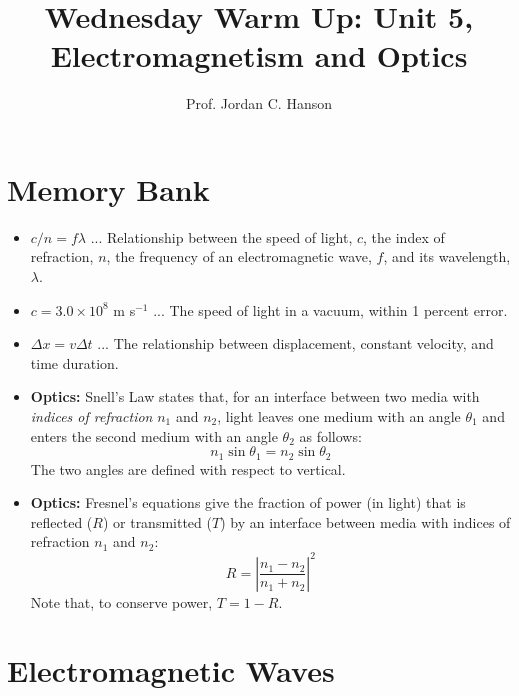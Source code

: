 \documentclass{article}
\begin{document}
\twocolumn

\title{Wednesday Warm Up: Unit 5, Electromagnetism and Optics}
\author{Prof. Jordan C. Hanson}

\maketitle

\section{Memory Bank}

\begin{itemize}
\item $c/n = f \lambda$ ... Relationship between the speed of light, $c$, the index of refraction, $n$, the frequency of an electromagnetic wave, $f$, and its wavelength, $\lambda$.
\item $c = 3.0 \times 10^8$ m s$^{-1}$ ... The speed of light in a vacuum, within 1 percent error.
\item $\Delta x = v \Delta t$ ... The relationship between displacement, constant velocity, and time duration.
\item \textbf{Optics:} Snell's Law states that, for an interface between two media with \textit{indices of refraction} $n_1$ and $n_2$, light leaves one medium with an angle $\theta_1$ and enters the second medium with an angle $\theta_2$ as follows:
\begin{equation}
n_1 \sin\theta_1 = n_2\sin\theta_2
\end{equation}
\noindent The two angles are defined with respect to vertical.
\item \textbf{Optics:} Fresnel's equations give the fraction of power (in light) that is reflected ($R$) or transmitted ($T$) by an interface between media with indices of refraction $n_1$ and $n_2$:
\begin{equation}
R = \left| \frac{n_1 - n_2}{n_1 + n_2} \right|^2 \label{eq:2}
\end{equation}
\noindent Note that, to conserve power, $T = 1 - R$.
\end{itemize}

\section{Electromagnetic Waves}
\end{document}
